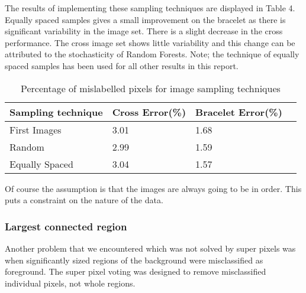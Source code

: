 \documentclass[12pt]{IIBproject}
\begin{document}
The results of implementing these sampling techniques are displayed in Table 4. Equally spaced samples gives a small improvement on the bracelet as there is significant variability in the image set. There is a slight decrease in the cross performance. The cross image set shows little variability and this change can be attributed to the stochasticity of Random Forests. Note; the technique of equally spaced samples has been used for all other results in this report.
\begin{table}
\begin{center}
    \begin{tabular}{ | l | l | l | p{5cm} |}
    \hline
    Sampling technique & Cross Error(\%) & Bracelet Error(\%) \\ \hline
    First Images & 3.01 & 1.68 \\ \hline
    Random & 2.99 & 1.59 \\
    \hline
    Equally Spaced & 3.04 & 1.57 \\
    \hline
    \end{tabular}
    \caption{Percentage of mislabelled pixels for image sampling techniques}\label{table:somename}
\end{center}
\end{table}
 Of course the assumption is that the images are always going to be in order. This puts a constraint on the nature of the data.

\subsubsection{Largest connected region}
Another problem that we encountered which was not solved by super pixels was when significantly sized regions of the background were misclassified as foreground. The super pixel voting was designed to remove misclassified individual pixels, not whole regions. 
\end{document}
